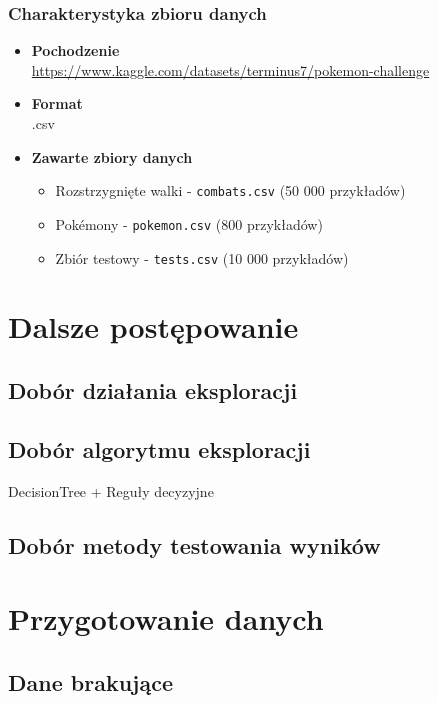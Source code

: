 \documentclass[12pt, a4paper]{report}
\begin{document}
\subsubsection*{Charakterystyka zbioru danych}
\begin{itemize}
    \item \textbf{Pochodzenie}\\
    \url{https://www.kaggle.com/datasets/terminus7/pokemon-challenge}

    \item \textbf{Format}\\.csv

    \item \textbf{Zawarte zbiory danych}
    \begin{itemize}
        \item Rozstrzygnięte walki - \texttt{combats.csv} (50 000 przykładów)
        \item Pokémony - \texttt{pokemon.csv} (800 przykładów)
        \item Zbiór testowy - \texttt{tests.csv} (10 000 przykładów)
    \end{itemize}

\end{itemize}

\section{Dalsze postępowanie}

\subsection{Dobór działania eksploracji}
\subsection{Dobór algorytmu eksploracji}
DecisionTree + Reguły decyzyjne

\subsection{Dobór metody testowania wyników}

\section{Przygotowanie danych}

\subsection{Dane brakujące}
\end{document}
